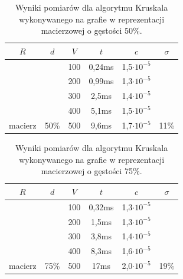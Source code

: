 \documentclass[a4paper,12pt]{article}
\begin{document}
\begin{table}[H]
	\centering
	\caption{\centering Wyniki pomiarów dla algorytmu Kruskala wykonywanego na grafie w reprezentacji macierzowej o gęstości 50\%.}
	\begin{tabular}{|c|c|c|c|c|c|}
		\hline
		\rowcolor[HTML]{C0C0C0} 
		$R$                       & $d$                    & $V$ & $t$    & $c$                & $\sigma$               \\ \hline
		&                        & 100 & 0,24ms & 1,5$\cdot 10^{-5}$ &                        \\ \cline{3-5}
		&                        & 200 & 0,99ms & 1,3$\cdot 10^{-5}$ &                        \\ \cline{3-5}
		&                        & 300 & 2,5ms  & 1,4$\cdot 10^{-5}$ &                        \\ \cline{3-5}
		&                        & 400 & 5,1ms  & 1,5$\cdot 10^{-5}$ &                        \\ \cline{3-5}
		\multirow{-5}{*}{macierz} & \multirow{-5}{*}{50\%} & 500 & 9,6ms  & 1,7$\cdot 10^{-5}$ & \multirow{-5}{*}{11\%} \\ \hline
	\end{tabular}
\end{table}

\begin{table}[H]
	\centering
	\caption{\centering Wyniki pomiarów dla algorytmu Kruskala wykonywanego na grafie w reprezentacji macierzowej o gęstości 75\%.}
	\begin{tabular}{|c|c|c|c|c|c|}
		\hline
		\rowcolor[HTML]{C0C0C0} 
		$R$                       & $d$                    & $V$ & \multicolumn{1}{c|}{\cellcolor[HTML]{C0C0C0}$t$} & $c$                & $\sigma$               \\ \hline
		&                        & 100 & 0,32ms                                           & 1,3$\cdot 10^{-5}$ &                        \\ \cline{3-5}
		&                        & 200 & 1,5ms                                            & 1,3$\cdot 10^{-5}$ &                        \\ \cline{3-5}
		&                        & 300 & 3,8ms                                            & 1,4$\cdot 10^{-5}$ &                        \\ \cline{3-5}
		&                        & 400 & 8,3ms                                            & 1,6$\cdot 10^{-5}$ &                        \\ \cline{3-5}
		\multirow{-5}{*}{macierz} & \multirow{-5}{*}{75\%} & 500 & 17ms                                             & 2,0$\cdot 10^{-5}$ & \multirow{-5}{*}{19\%} \\ \hline
	\end{tabular}
\end{table}
\end{document}
